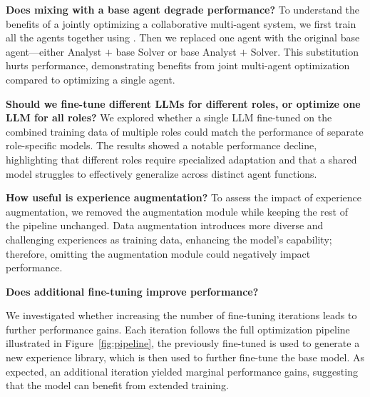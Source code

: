 \textbf{Does mixing \model{} with a base agent degrade performance?} To understand the benefits of a jointly optimizing a collaborative multi-agent system, we first train all the agents together using \model{}. Then we replaced one \model{} agent with the original base agent---either \model{} Analyst $+$ base Solver or base Analyst $+$ \model{} Solver. This substitution hurts performance, demonstrating benefits from joint multi-agent optimization compared to optimizing a single agent. 

\textbf{Should we fine-tune different LLMs for different roles, or optimize one LLM for all roles?}  
We explored whether a single LLM fine-tuned on the combined training data of multiple roles could match the performance of separate role-specific models. 
The results showed a notable performance decline, highlighting that different roles require specialized adaptation and that a shared model struggles to effectively generalize across distinct agent functions.

\textbf{How useful is experience augmentation?}  
To assess the impact of experience augmentation, we removed the augmentation module while keeping the rest of the pipeline unchanged. Data augmentation introduces more diverse and challenging experiences as training data, enhancing the model's capability; therefore, omitting the augmentation module could negatively impact performance.

\textbf{Does additional fine-tuning improve performance?
}  

We investigated whether increasing the number of fine-tuning iterations leads to further performance gains. Each iteration follows the full optimization pipeline illustrated in Figure~\ref{fig:pipeline}, the previously fine-tuned \model{} is used to generate a new experience library, which is then used to further fine-tune the base model.
As expected, an additional iteration yielded marginal performance gains, suggesting that the model can benefit from extended training.


